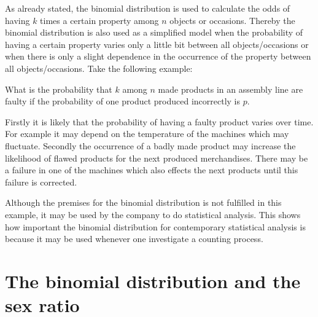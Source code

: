 As already stated, the binomial distribution is used to calculate the odds of having $k$ times a certain property among $n$ objects or occasions. Thereby the binomial distribution is also used as a simplified model when the probability of having a certain property varies only a little bit between all objects/occasions or when there is only a slight dependence in the occurrence of the property between all objects/occasions. Take the following example:

\begin{example}
  What is the probability that $k$ among $n$ made products in an assembly line are faulty if the probability of one product produced incorrectly is $p$.
\end{example}

Firstly it is likely that the probability of having a faulty product varies over time. For example it may depend on the temperature of the machines which may fluctuate. Secondly the occurrence of a badly made product may increase the likelihood of flawed products for the next produced merchandises. There may be a failure in one of the machines which also effects the next products until this failure is corrected.

Although the premises for the binomial distribution is not fulfilled in this example, it may be used by the company to do statistical analysis. This shows how important the binomial distribution for contemporary statistical analysis is because it may be used whenever one investigate a counting process.

\section{The binomial distribution and the sex ratio}



